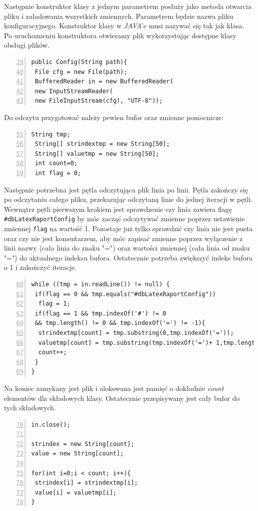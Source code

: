 Następnie konstruktor klasy z jednym parametrem posłuży jako metoda otwarcia pliku i załadowania wszystkich zmiennych. Parametrem będzie nazwa pliku konfiguracyjnego. Konstruktor klasy w \emph{JAVA}'e musi nazywać się tak jak klasa. Po uruchomieniu konstruktora otwieramy plik wykorzystując dostępne klasy obsługi plików.
\begin{lstlisting}[numbers=left,firstnumber=39]
public Config(String path){
 File cfg = new File(path);
 BufferedReader in = new BufferedReader(
 new InputStreamReader(
 new FileInputStream(cfg), "UTF-8"));
\end{lstlisting}
Do odczytu przygotować należy pewien bufor oraz zmienne pomocnicze:
\begin{lstlisting}[numbers=left,firstnumber=55]
 String tmp;
 String[] strindextmp = new String[50];
 String[] valuetmp = new String[50];
 int count=0;
 int flag = 0;
\end{lstlisting}

Następnie potrzebna jest pętla odczytująca plik linia po linii. Pętla zakończy się po odczytaniu całego pliku, przekazując odczytaną linie do jednej iteracji w pętli. Wewnątrz pętli pierwszym krokiem jest sprawdzenie czy linia zawiera flagę \texttt{\#dbLatexRaportConfig} by móc zacząć odczytywać zmienne poprzez ustawienie zmiennej \texttt{flag} na wartość 1. Pozostaje już tylko sprawdzić czy linia nie jest pusta oraz czy nie jest komentarzem, aby móc zapisać zmienne poprzez wyłączenie z linii nazwy (cała linia do znaku "=") oraz wartości zmiennej (cała linia od znaku "=") do aktualnego indeksu bufora. Ostatecznie potrzeba zwiększyć indeks bufora o 1 i zakończyć iteracje.
\begin{lstlisting}[numbers=left,firstnumber=60]
while ((tmp = in.readLine()) != null) {
 if(flag == 0 && tmp.equals("#dbLatexRaportConfig"))
  flag = 1;
 if(flag == 1 && tmp.indexOf('#') != 0
 && tmp.length() != 0 && tmp.indexOf('=') != -1){
  strindextmp[count] = tmp.substring(0,tmp.indexOf('='));
  valuetmp[count] = tmp.substring(tmp.indexOf('=')+ 1,tmp.length());
  count++;
 }
}
\end{lstlisting}

Na koniec zamykany jest plik i alokowana jest pamięć o dokładnie \emph{count} elementów dla składowych klasy. Ostatecznie przepisywany jest cały bufor do tych składowych.
\begin{lstlisting}[numbers=left,firstnumber=70]
in.close();
        
strindex = new String[count];
value = new String[count];
                  
for(int i=0;i < count; i++){
 strindex[i] = strindextmp[i];
 value[i] = valuetmp[i];
}
\end{lstlisting}

